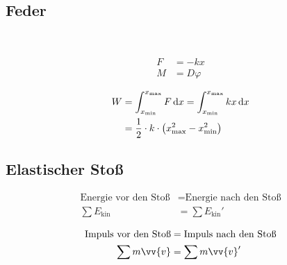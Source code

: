 \subsection{Feder}

\begin{boxleft}
\\
\end{boxleft}\begin{boxrightshaded}
\begin{align}
F&=-kx\\
M&=D\varphi
\end{align}
\end{boxrightshaded}

\begin{boxleft}
\end{boxleft}\begin{boxrightshaded}
\begin{align}
W	&=\int_{x_\text{min}}^{x_\text{max}}F\mathop{}\!\mathrm{d} x=\int_{x_\text{min}}^{x_\text{max}}kx\mathop{}\!\mathrm{d} x\\
	&=\frac{1}{2}\cdot k\cdot \left(x_{\text{max}}^2-x_{\text{min}}^2\right)
\end{align}
\end{boxrightshaded}

\subsection{Elastischer Stoß}

\begin{boxleft}
\end{boxleft}\begin{boxrightshaded}
\begin{align}
\text{Energie vor den Stoß} &= \text{Energie nach den Stoß}\nonumber\\
\sum E_{\text{kin}}&=\sum E_{\text{kin}}'
\end{align}
\end{boxrightshaded}

\begin{boxleft}
\end{boxleft}\begin{boxrightshaded}
\begin{align}
\text{Impuls vor den Stoß} &= \text{Impuls nach den Stoß}\nonumber\\
\sum m\vv{v}&= \sum m\vv{v}'
\end{align}
\end{boxrightshaded}

